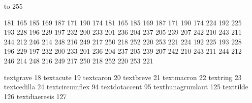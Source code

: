 

\startmapping[il2]

 to 255    %

 181 165    185 169 
 187 171    190 174 
 181 165    185 169 
 187 171    190 174 
 224 192    225 193 
 228 196    229 197 
 232 200    233 201 
 236 204    237 205 
 239 207    242 210 
 243 211    244 212 
 246 214    248 216 
 249 217    250 218 
 252 220    253 221 
 224 192    225 193 
 228 196    229 197 
 232 200    233 201 
 236 204    237 205 
 239 207    242 210 
 243 211    244 212 
 246 214    248 216 
 249 217    250 218 
 252 220    253 221 

\stopmapping

\startcoding[il2]

 textgrave          18
 textacute          19
 textcaron          20
 textbreve          21
 textmacron         22
 textring           23 
 textcedilla        24 
 textcircumflex     94
 textdotaccent      95
 texthunagrumlaut  125
 texttilde         126
 textdiaeresis     127

